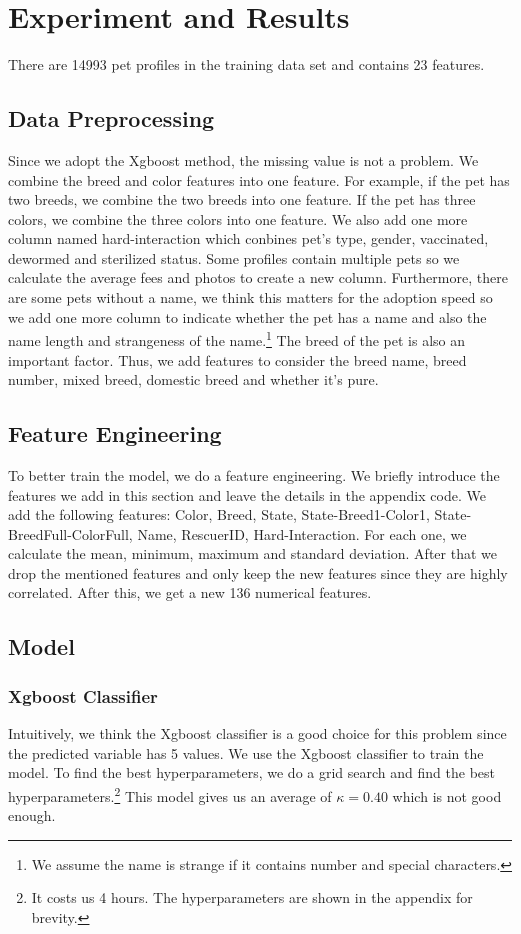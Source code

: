 \section{Experiment and Results}
There are 14993 pet profiles in the training data set and contains 23 features. 
\subsection{Data Preprocessing}
Since we adopt the Xgboost method, the missing value is not a problem. We combine the breed and color features into one feature. For example, if the pet has two breeds, we combine the two breeds into one feature. If the pet has three colors, we combine the three colors into one feature. We also add one more column named hard-interaction which conbines pet's type, gender, vaccinated, dewormed and sterilized status. Some profiles contain multiple pets so we calculate the average fees and photos to create a new column. Furthermore, there are some pets without a name, we think this matters for the adoption speed so we add one more column to indicate whether the pet has a name and also the name length and strangeness of the name.\footnote{We assume the name is strange if it contains number and special characters.} The breed of the pet is also an important factor. Thus, we add features to consider the breed name, breed number, mixed breed, domestic breed and whether it's pure. 

\subsection{Feature Engineering}
To better train the model, we do a feature engineering. We briefly introduce the features we add in this section and leave the details in the appendix code. We add the following features:
Color, Breed, State, State-Breed1-Color1, State-BreedFull-ColorFull, Name, RescuerID, Hard-Interaction. For each one, we calculate the mean, minimum, maximum and standard deviation. After that we drop the mentioned features and only keep the new features since they are highly correlated. After this, we get a new 136 numerical features. 

\subsection{Model}
\subsubsection{Xgboost Classifier}
Intuitively, we think the Xgboost classifier is a good choice for this problem since the predicted variable has 5 values. We use the Xgboost classifier to train the model. To find the best hyperparameters, we do a grid search and find the best hyperparameters.\footnote{It costs us 4 hours. The hyperparameters are shown in the appendix for brevity.} This model gives us an average of $\kappa=0.40$ which is not good enough. 

